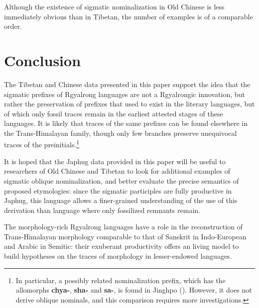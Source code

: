 \documentclass[oneside,a4paper,11pt]{article}
\newcommand{\ipa}[1]{\textbf{{\phon\mbox{#1}}}} %
\begin{document}
 Although the existence of sigmatic nominalization in Old Chinese is less immediately obvious than in Tibetan, the number of examples is of a comparable order.

\section{Conclusion}
The Tibetan and Chinese data presented in this paper support the idea that the sigmatic prefixes of Rgyalrong languages are not a Rgyalrongic innovation, but rather the preservation of  prefixes that used to exist in the literary languages, but of which only fossil traces remain in the earliest attested stages of these languages. It is likely that traces of the same prefixes can be found elsewhere in the Trans-Himalayan family, though only few branches preserve unequivocal traces of the preinitials.\footnote{In particular, a possibly related nominalization prefix, which has the allomorphs \ipa{chya-}, \ipa{sha-} and \ipa{sa-}, is found in Jinghpo (\citealt[3-4]{dai90yufa}). However, it does not derive oblique nominals, and this comparison requires more investigations. }

It is hoped that the Japhug data provided in this paper will be useful to researchers of Old Chinese and Tibetan to look for additional examples of sigmatic oblique nominalization, and better evaluate the precise semantics of proposed etymologies: since the sigmatic participles are fully productive in Japhug, this language allows a finer-grained understanding of the use of this derivation than language where only fossilized remnants remain. 

The morphology-rich Rgyalrong languages have a role in the reconstruction of Trans-Himalayan morphology comparable to that of Sanskrit in Indo-European and Arabic in Semitic: their exuberant productivity offers an living model to build hypotheses on the traces of morphology in lesser-endowed languages.



\end{document}
